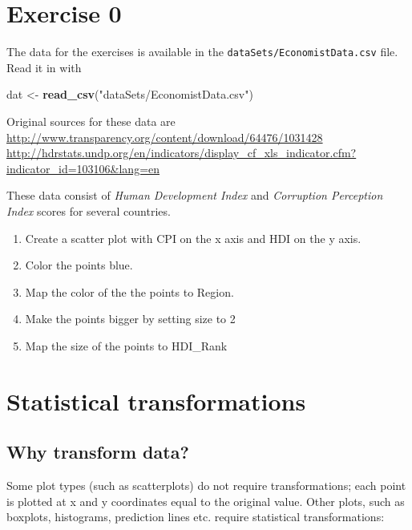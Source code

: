 \documentclass[]{book}
\newenvironment{Shaded}{\begin{snugshade}}{\end{snugshade}}
\newcommand{\KeywordTok}[1]{\textcolor[rgb]{0.13,0.29,0.53}{\textbf{#1}}}
\newcommand{\StringTok}[1]{\textcolor[rgb]{0.31,0.60,0.02}{#1}}
\newcommand{\NormalTok}[1]{#1}
\providecommand{\tightlist}{%
  \setlength{\itemsep}{0pt}\setlength{\parskip}{0pt}}
\begin{document}
\section{Exercise 0}\label{exercise-0-2}

The data for the exercises is available in the
\texttt{dataSets/EconomistData.csv} file. Read it in with

\begin{Shaded}
\begin{Highlighting}[]
\NormalTok{dat <-}\StringTok{ }\KeywordTok{read_csv}\NormalTok{(}\StringTok{"dataSets/EconomistData.csv"}\NormalTok{)}
\end{Highlighting}
\end{Shaded}

Original sources for these data are
\url{http://www.transparency.org/content/download/64476/1031428}
\url{http://hdrstats.undp.org/en/indicators/display_cf_xls_indicator.cfm?indicator_id=103106\&lang=en}

These data consist of \emph{Human Development Index} and
\emph{Corruption Perception Index} scores for several countries.

\begin{enumerate}
\def\labelenumi{\arabic{enumi}.}
\tightlist
\item
  Create a scatter plot with CPI on the x axis and HDI on the y axis.
\item
  Color the points blue.
\item
  Map the color of the the points to Region.
\item
  Make the points bigger by setting size to 2
\item
  Map the size of the points to HDI\_Rank
\end{enumerate}

\section{Statistical transformations}\label{statistical-transformations}

\subsection{Why transform data?}\label{why-transform-data}

Some plot types (such as scatterplots) do not require transformations;
each point is plotted at x and y coordinates equal to the original
value. Other plots, such as boxplots, histograms, prediction lines etc.
require statistical transformations:
\end{document}
